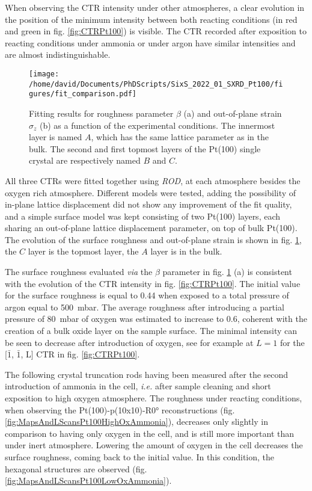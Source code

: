 When observing the CTR intensity under other atmospheres, a clear evolution in the position of the minimum intensity between both reacting conditions (in red and green in fig. \ref{fig:CTRPt100}) is visible.
The CTR recorded after exposition to reacting conditions under ammonia or under argon have similar intensities and are almost indistinguishable.

\begin{figure}[!htb]
    \centering
    \texttt{[image: /home/david/Documents/PhDScripts/SixS\_2022\_01\_SXRD\_Pt100/figures/fit\_comparison.pdf]}
    \caption{
        Fitting results for roughness parameter $\beta$ (a) and out-of-plane strain $\sigma_z$ (b) as a function of the experimental conditions.
        The innermost layer is named $A$, which has the same lattice parameter as in the bulk.
        The second and first topmost layers of the Pt(100) single crystal are respectively named $B$ and $C$.
    }
    \label{fig:CTRFit100}
\end{figure}

All three CTRs were fitted together using \textit{ROD}, at each atmosphere besides the oxygen rich atmosphere.
Different models were tested, adding the possibility of in-plane lattice displacement did not show any improvement of the fit quality, and a simple surface model was kept consisting of two Pt(100) layers, each sharing an out-of-plane lattice displacement parameter, on top of bulk Pt(100).
The evolution of the surface roughness and out-of-plane strain is shown in fig. \ref{fig:CTRFit100}, the $C$ layer is the topmost layer, the $A$ layer is in the bulk.

The surface roughness evaluated \textit{via} the $\beta$ parameter in fig. \ref{fig:CTRFit100} (a) is consistent with the evolution of the CTR intensity in fig. \ref{fig:CTRPt100}.
The initial value for the surface roughness is equal to \num{0.44} when exposed to a total pressure of argon equal to \qty{500}{\milli\bar}.
The average roughness after introducing a partial pressure of \qty{80}{\milli\bar} of oxygen was estimated to increase to \num{0.6}, coherent with the creation of a bulk oxide layer on the sample surface.
The minimal intensity can be seen to decrease after introduction of oxygen, see for example at $L=1$ for the [$\bar{1}$, $\bar{1}$, L] CTR in fig. \ref{fig:CTRPt100}.

The following crystal truncation rods having been measured after the second introduction of ammonia in the cell, \textit{i.e.} after sample cleaning and short exposition to high oxygen atmosphere.
The roughness under reacting conditions, when observing the Pt(100)-p(10x10)-R\ang{0} reconstructions (fig. \ref{fig:MapsAndLScansPt100HighOxAmmonia}), decreases only slightly in comparison to having only oxygen in the cell, and is still more important than under inert atmosphere.
Lowering the amount of oxygen in the cell decreases the surface roughness, coming back to the initial value.
In this condition, the hexagonal structures are observed (fig. \ref{fig:MapsAndLScansPt100LowOxAmmonia}).

